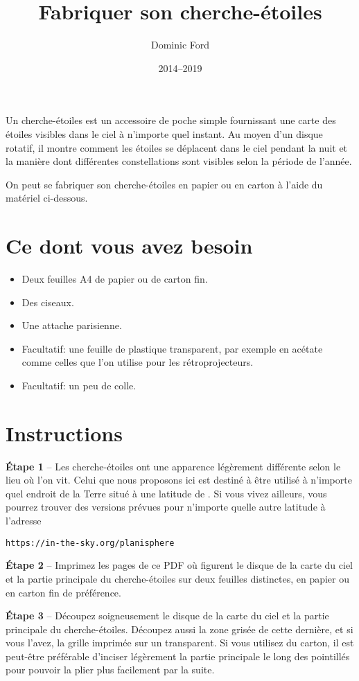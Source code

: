 \documentclass[a4paper,onecolumn,10pt]{article}
\title{Fabriquer son cherche-étoiles}
\author{Dominic Ford}
\date{2014--2019}
\begin{document}
\maketitle
\setcounter{footnote}{1}

Un cherche-étoiles est un accessoire de poche simple fournissant une carte des étoiles visibles dans le ciel à n’importe quel instant. Au moyen d’un disque rotatif, il montre comment les étoiles se déplacent dans le ciel pendant la nuit et la manière dont différentes constellations sont visibles selon la période de l’année.

On peut se fabriquer son cherche-étoiles en papier ou en carton à l’aide du matériel ci-dessous.

\section*{Ce dont vous avez besoin}

\begin{itemize}
\item Deux feuilles A4 de papier ou de carton fin.
\item Des ciseaux.
\item Une attache parisienne.
\item Facultatif: une feuille de plastique transparent, par exemple en acétate comme celles que l’on utilise pour les rétroprojecteurs.
\item Facultatif: un peu de colle.
\end{itemize}

\section*{Instructions}

{\bf Étape 1} -- Les cherche-étoiles ont une apparence légèrement différente selon le lieu où l’on vit. Celui que nous proposons ici est destiné à être utilisé à n’importe quel endroit de la Terre situé à une latitude de . Si vous vivez ailleurs, vous pourrez trouver des versions prévues pour n’importe quelle autre latitude à l’adresse

\centerline{\tt https://in-the-sky.org/planisphere}

{\bf Étape 2} -- Imprimez les pages de ce PDF où figurent le disque de la carte du ciel et la partie principale du cherche-étoiles sur deux feuilles distinctes, en papier ou en carton fin de préférence.

{\bf Étape 3} -- Découpez soigneusement le disque de la carte du ciel et la partie principale du cherche-étoiles. Découpez aussi la zone grisée de cette dernière, et si vous l’avez, la grille imprimée sur un transparent. Si vous utilisez du carton, il est peut-être préférable d’inciser légèrement la partie principale le long des pointillés pour pouvoir la plier plus facilement par la suite.
\end{document}

